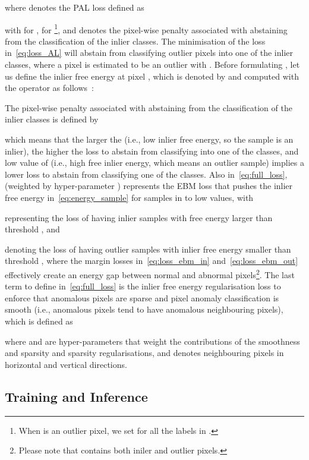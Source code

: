 \documentclass[runningheads]{llncs}
\begin{document}
where  denotes the PAL loss defined as

with  for ,  for \footnote{When  is an outlier pixel, we set  for all the  labels in .},
and  denotes the pixel-wise penalty associated with abstaining from the classification of the inlier classes.
The minimisation of the loss in~\eqref{eq:loss_AL} will abstain from classifying outlier pixels into one of the inlier classes, where a pixel is estimated to be an outlier with . 
Before formulating , let us define 
the inlier free energy at pixel , which is denoted by  and computed with the  operator as follows~\cite{lecun2006tutorial,liu2020energy,grathwohl2019your}:

The pixel-wise penalty associated with abstaining from the classification of the inlier classes is defined by

which means that the larger the  (i.e., low inlier free energy, so the sample is an inlier), the higher the loss to abstain from classifying into one of the  classes, and low value of  (i.e., high free inlier energy, which means an outlier sample) implies a lower loss to abstain from classifying one of the  classes.
Also in~\eqref{eq:full_loss},
 (weighted by hyper-parameter )
represents the EBM loss that pushes the inlier free energy in~\eqref{eq:energy_sample} for samples in  to low values, with

representing the loss of having inlier samples with free energy larger than threshold , and 

denoting the loss of having outlier samples with inlier free energy smaller than threshold , where the margin losses in~\eqref{eq:loss_ebm_in} 
and~\eqref{eq:loss_ebm_out} effectively create an energy gap between normal and abnormal pixels\footnote{Please note that  contains both iniler and outlier pixels. }.
The last term to define in~\eqref{eq:full_loss} is the inlier free energy regularisation loss to enforce that anomalous pixels are sparse and pixel anomaly classification is smooth (i.e., anomalous pixels tend to have anomalous neighbouring pixels), which is defined as

where  and  are hyper-parameters that weight the contributions of the smoothness and sparsity and sparsity regularisations, and   denotes neighbouring pixels in horizontal and vertical directions. 


\vspace{-10pt}
\subsection{Training and Inference}
\label{sec:train_inference}
\end{document}
